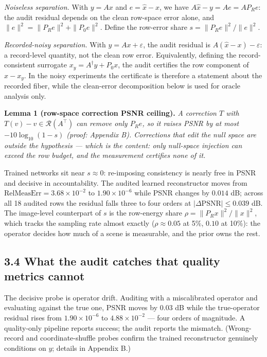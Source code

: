 \documentclass[11pt]{article}
\begin{document}
\textit{Noiseless separation.} With $y = Ax$ and $e = \hat{x} - x$, we have $A\hat{x} - y = Ae = A P_R e$: the audit residual depends on the clean row-space error alone, and $\|e\|^2 = \|P_R e\|^2 + \|P_0 e\|^2$. Define the row-error share $s = \|P_R e\|^2/\|e\|^2$.

\textit{Recorded-noisy separation.} With $y = Ax + \varepsilon$, the audit residual is $A(\hat{x} - x) - \varepsilon$: a record-level quantity, not the clean row error. Equivalently, defining the record-consistent surrogate $x_y = A^\dagger y + P_0 x$, the audit certifies the row component of $\hat{x} - x_y$. In the noisy experiments the certificate is therefore a statement about the recorded fiber, while the clean-error decomposition below is used for oracle analysis only.

\textbf{Lemma 1 (row-space correction PSNR ceiling).} \textit{A correction $T$ with $T(v) - v \in \mathcal{R}(A^\top)$ can remove only $P_R e$, so it raises PSNR by at most $-10\log_{10}(1-s)$ (proof: Appendix B). Corrections that edit the null space are outside the hypothesis --- which is the content: only null-space injection can exceed the row budget, and the measurement certifies none of it.}

Trained networks sit near $s \approx 0$: re-imposing consistency is nearly free in PSNR and decisive in accountability. The audited learned reconstructor moves from $\mathrm{RelMeasErr} = 3.68\times10^{-2}$ to $1.90\times10^{-6}$ while PSNR changes by $0.014$ dB; across all 18 audited rows the residual falls three to four orders at $|\Delta\mathrm{PSNR}| \le 0.039$ dB. The image-level counterpart of $s$ is the row-energy share $\rho = \|P_R x\|^2/\|x\|^2$, which tracks the sampling rate almost exactly ($\rho \approx 0.05$ at 5\%, $0.10$ at 10\%): the operator decides how much of a scene is measurable, and the prior owns the rest.

\subsection*{3.4 What the audit catches that quality metrics cannot}

The decisive probe is operator drift. Auditing with a miscalibrated operator and evaluating against the true one, PSNR moves by $0.03$ dB while the true-operator residual rises from $1.90\times10^{-6}$ to $4.88\times10^{-2}$ --- four orders of magnitude. A quality-only pipeline reports success; the audit reports the mismatch. (Wrong-record and coordinate-shuffle probes confirm the trained reconstructor genuinely conditions on $y$; details in Appendix B.)
\end{document}
